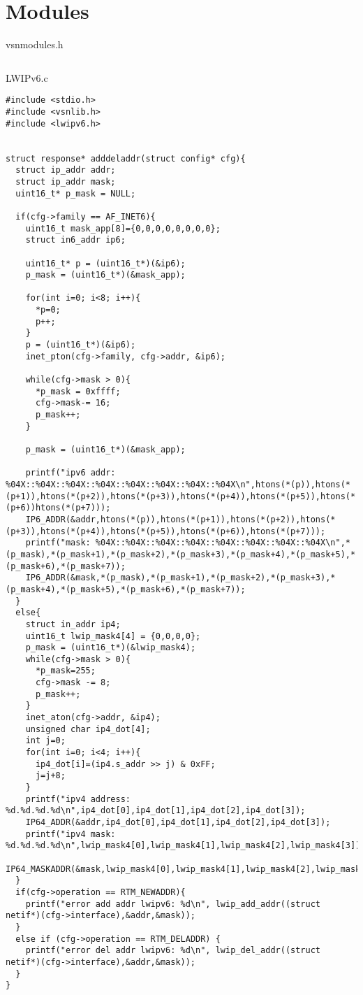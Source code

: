 \chapter{Modules}               %
\label{code:AppB}
vsnmodules.h
\begin{lstlisting}[style=CscriptStyle]

\end{lstlisting}

LWIPv6.c
\begin{lstlisting}[style=CscriptStyle]
#include <stdio.h>
#include <vsnlib.h>
#include <lwipv6.h>


struct response* adddeladdr(struct config* cfg){
  struct ip_addr addr;
  struct ip_addr mask;
  uint16_t* p_mask = NULL;

  if(cfg->family == AF_INET6){
    uint16_t mask_app[8]={0,0,0,0,0,0,0,0};
    struct in6_addr ip6;

    uint16_t* p = (uint16_t*)(&ip6);
    p_mask = (uint16_t*)(&mask_app);

    for(int i=0; i<8; i++){
      *p=0;
      p++;
    }
    p = (uint16_t*)(&ip6);
    inet_pton(cfg->family, cfg->addr, &ip6);

    while(cfg->mask > 0){
      *p_mask = 0xffff;
      cfg->mask-= 16;
      p_mask++;
    }

    p_mask = (uint16_t*)(&mask_app);

    printf("ipv6 addr: %04X::%04X::%04X::%04X::%04X::%04X::%04X::%04X\n",htons(*(p)),htons(*(p+1)),htons(*(p+2)),htons(*(p+3)),htons(*(p+4)),htons(*(p+5)),htons(*(p+6))htons(*(p+7)));
    IP6_ADDR(&addr,htons(*(p)),htons(*(p+1)),htons(*(p+2)),htons(*(p+3)),htons(*(p+4)),htons(*(p+5)),htons(*(p+6)),htons(*(p+7)));
    printf("mask: %04X::%04X::%04X::%04X::%04X::%04X::%04X::%04X\n",*(p_mask),*(p_mask+1),*(p_mask+2),*(p_mask+3),*(p_mask+4),*(p_mask+5),*(p_mask+6),*(p_mask+7));
    IP6_ADDR(&mask,*(p_mask),*(p_mask+1),*(p_mask+2),*(p_mask+3),*(p_mask+4),*(p_mask+5),*(p_mask+6),*(p_mask+7));
  }
  else{
    struct in_addr ip4;
    uint16_t lwip_mask4[4] = {0,0,0,0};
    p_mask = (uint16_t*)(&lwip_mask4);
    while(cfg->mask > 0){
      *p_mask=255;
      cfg->mask -= 8;
      p_mask++;
    }
    inet_aton(cfg->addr, &ip4);
    unsigned char ip4_dot[4];
    int j=0;
    for(int i=0; i<4; i++){
      ip4_dot[i]=(ip4.s_addr >> j) & 0xFF;
      j=j+8;
    }
    printf("ipv4 address: %d.%d.%d.%d\n",ip4_dot[0],ip4_dot[1],ip4_dot[2],ip4_dot[3]);
    IP64_ADDR(&addr,ip4_dot[0],ip4_dot[1],ip4_dot[2],ip4_dot[3]);
    printf("ipv4 mask: %d.%d.%d.%d\n",lwip_mask4[0],lwip_mask4[1],lwip_mask4[2],lwip_mask4[3]);
    IP64_MASKADDR(&mask,lwip_mask4[0],lwip_mask4[1],lwip_mask4[2],lwip_mask4[3]);
  }
  if(cfg->operation == RTM_NEWADDR){
    printf("error add addr lwipv6: %d\n", lwip_add_addr((struct netif*)(cfg->interface),&addr,&mask));
  }
  else if (cfg->operation == RTM_DELADDR) {
    printf("error del addr lwipv6: %d\n", lwip_del_addr((struct netif*)(cfg->interface),&addr,&mask));
  }
}


\end{lstlisting}
